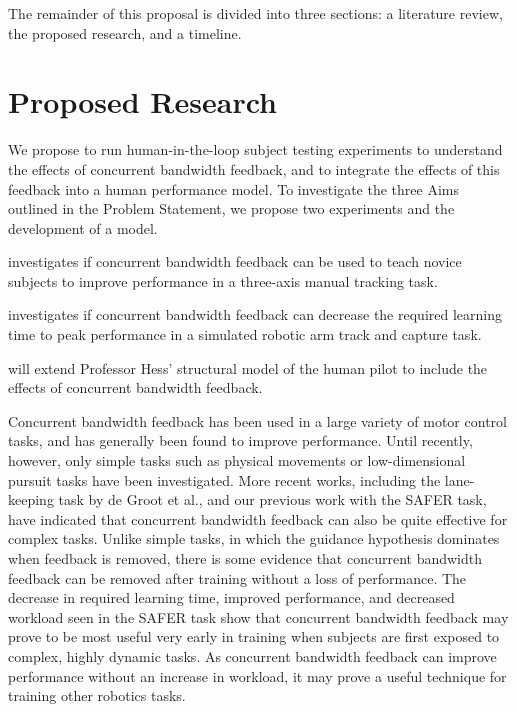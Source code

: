 The remainder of this proposal is divided into three sections: a literature review, the proposed research, and a timeline.



% 

\section{Proposed Research}
We propose to run human-in-the-loop subject testing experiments to understand the effects of concurrent bandwidth feedback, and to integrate the effects of this feedback into a human performance model.
To investigate the three Aims outlined in the Problem Statement, we propose two experiments and the development of a model.

\begin{description}[align=left]
\item [Experiment One] investigates if concurrent bandwidth feedback can be used to teach novice subjects to improve performance in a three-axis manual tracking task.
\item [Experiment Two] investigates if concurrent bandwidth feedback can decrease the required learning time to peak performance in a simulated robotic arm track and capture task.
\item [The Model] will extend Professor Hess' structural model of the human pilot to include the effects of concurrent bandwidth feedback.
\end{description}

Concurrent bandwidth feedback has been used in a large variety of motor control tasks, and has generally been found to improve performance.
Until recently, however, only simple tasks such as physical movements or low-dimensional pursuit tasks have been investigated.
More recent works, including the lane-keeping task by de Groot et al., and our previous work with the SAFER task, have indicated that concurrent bandwidth feedback can also be quite effective for complex tasks.
Unlike simple tasks, in which the guidance hypothesis dominates when feedback is removed, there is some evidence that concurrent bandwidth feedback can be removed after training without a loss of performance.
The decrease in required learning time, improved performance, and decreased workload seen in the SAFER task show that concurrent bandwidth feedback may prove to be most useful very early in training when subjects are first exposed to complex, highly dynamic tasks.
As concurrent bandwidth feedback can improve performance without an increase in workload, it may prove a useful technique for training other robotics tasks.

